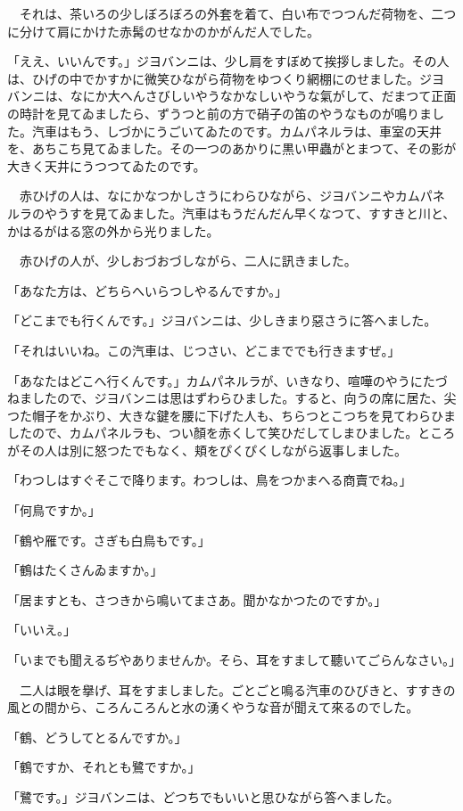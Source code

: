 \documentclass[tate,paper=b6j,jafontsize=9pt]{jlreq}
\begin{document}
　それは、茶いろの少しぼろぼろの外套を着て、白い布でつつんだ荷物を、二つに分けて肩にかけた赤髯のせなかのかがんだ人でした。

「ええ、いいんです。」ジヨバンニは、少し肩をすぼめて挨拶しました。その人は、ひげの中でかすかに微笑ひながら荷物をゆつくり網棚にのせました。ジヨバンニは、なにか大へんさびしいやうなかなしいやうな氣がして、だまつて正面の時計を見てゐましたら、ずうつと前の方で硝子の笛のやうなものが鳴りました。汽車はもう、しづかにうごいてゐたのです。カムパネルラは、車室の天井を、あちこち見てゐました。その一つのあかりに黒い甲蟲がとまつて、その影が大きく天井にうつつてゐたのです。

　赤ひげの人は、なにかなつかしさうにわらひながら、ジヨバンニやカムパネルラのやうすを見てゐました。汽車はもうだんだん早くなつて、すすきと川と、かはるがはる窓の外から光りました。

　赤ひげの人が、少しおづおづしながら、二人に訊きました。

「あなた方は、どちらへいらつしやるんですか。」

「どこまでも行くんです。」ジヨバンニは、少しきまり惡さうに答へました。

「それはいいね。この汽車は、じつさい、どこまででも行きますぜ。」

「あなたはどこへ行くんです。」カムパネルラが、いきなり、喧嘩のやうにたづねましたので、ジヨバンニは思はずわらひました。すると、向うの席に居た、尖つた帽子をかぶり、大きな鍵を腰に下げた人も、ちらつとこつちを見てわらひましたので、カムパネルラも、つい顏を赤くして笑ひだしてしまひました。ところがその人は別に怒つたでもなく、頬をぴくぴくしながら返事しました。

「わつしはすぐそこで降ります。わつしは、鳥をつかまへる商賣でね。」

「何鳥ですか。」

「鶴や雁です。さぎも白鳥もです。」

「鶴はたくさんゐますか。」

「居ますとも、さつきから鳴いてまさあ。聞かなかつたのですか。」

「いいえ。」

「いまでも聞えるぢやありませんか。そら、耳をすまして聽いてごらんなさい。」

　二人は眼を擧げ、耳をすましました。ごとごと鳴る汽車のひびきと、すすきの風との間から、ころんころんと水の湧くやうな音が聞えて來るのでした。

「鶴、どうしてとるんですか。」

「鶴ですか、それとも鷺ですか。」

「鷺です。」ジヨバンニは、どつちでもいいと思ひながら答へました。
\end{document}
